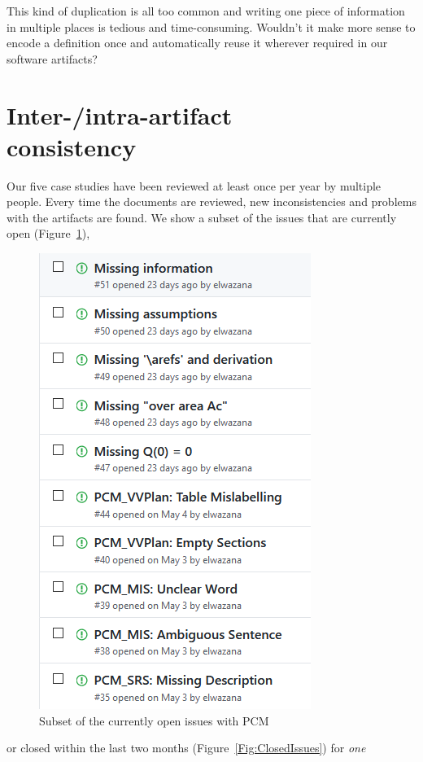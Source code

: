 \documentclass[twocolumn]{article}
\begin{document}
This kind of duplication is all too common and writing one piece of information 
in multiple places is tedious and time-consuming. Wouldn't it make more sense 
to encode a definition once and automatically reuse it wherever required in 
our software artifacts?

\section{Inter-/intra-artifact\\consistency}
\label{Sec:consistency}

Our five case studies have been reviewed at least once per year by multiple 
people. Every time the documents are reviewed, new inconsistencies and problems 
with the artifacts are found. We show a subset of the 
issues that are currently open (Figure~\ref{Fig:OpenIssues}), 
\begin{figure}
  \centering
  \includegraphics[width=0.7\linewidth]{OpenIssuesSWHS.PNG}
  \caption{Subset of the currently open issues with PCM}
  \label{Fig:OpenIssues}
\end{figure}
or closed within 
the last two months (Figure~\ref{Fig:ClosedIssues}) for \emph{one} 
\end{document}
